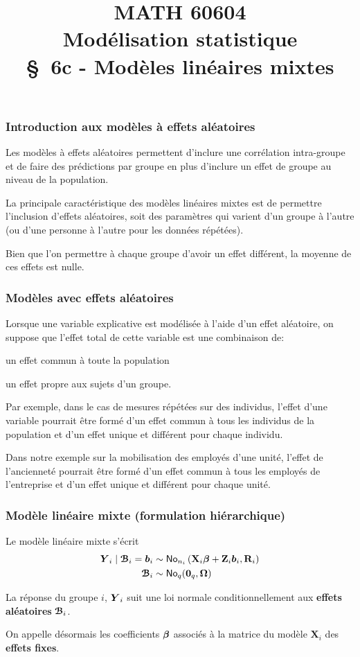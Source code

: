 \documentclass{beamer}
\title[\color{white}{MATH 60604 \S~6c - Modèles linéaires mixtes}]{\texorpdfstring{MATH 60604 \\Modélisation statistique \\ \S~6c - Modèles linéaires mixtes}{MATH 60604 \\Modélisation statistique \\ \S~6c - Modèles linéaires mixtes}}
\author{}
\institute{HEC Montréal\\
Département de sciences de la décision}
\date{}
\begin{document}
\frame{\titlepage}

\begin{frame}
\frametitle{Introduction aux modèles à effets aléatoires}
Les modèles à effets aléatoires permettent d'inclure une corrélation intra-groupe et de faire des prédictions par groupe en plus d'inclure un effet de groupe au niveau de la population.
\bi \item La principale caractéristique des \alert{modèles linéaires mixtes} est de permettre l'inclusion d'\alert{effets aléatoires},  soit des paramètres qui varient d'un groupe à l'autre (ou d'une personne à l'autre pour les données répétées).
\item Bien que l'on permettre à chaque groupe d'avoir un effet différent, la moyenne de ces effets est nulle.
\ei
\end{frame}

\begin{frame}[fragile]
\frametitle{Modèles avec effets aléatoires}
\bi
\item Lorsque une variable explicative est modélisée à l'aide d'un effet aléatoire, on suppose que \alert{l'effet total de cette variable est une combinaison de}:
\be
\item un \alert{effet commun à toute la population}
\item un \alert{effet propre aux sujets d'un groupe}.
\ee
\item Par exemple, dans le cas de mesures répétées sur des individus, l'effet d'une variable pourrait être formé d'un effet commun à tous les individus de la population et d'un effet unique et différent pour chaque individu.
\item Dans notre exemple sur la mobilisation des employés d'une unité, l'effet de l'ancienneté pourrait être formé d'un effet commun à tous les employés de l'entreprise et d'un effet unique et différent pour chaque unité.
\ei
\end{frame}

\begin{frame}
 \frametitle{Modèle linéaire mixte (formulation hiérarchique)}
Le modèle linéaire mixte s'écrit
 \begin{align*}
  \boldsymbol {Y}_i \mid \boldsymbol {\mathcal{B}}_i =\boldsymbol {b}_i &\sim \mathsf{No}_{n_i}\left( \mathbf{X}_i \boldsymbol {\beta} + \mathbf{Z}_i\boldsymbol {b}_i, \mathbf{R}_i\right) \\
  \boldsymbol {\mathcal{B}}_i & \sim \mathsf{No}_{q}( \boldsymbol {0}_q, \boldsymbol {\Omega})
 \end{align*}

 \bi \item 
 La réponse du groupe $i$, $\boldsymbol {Y}_i$ suit une loi normale conditionnellement aux \textbf{effets aléatoires} $  \boldsymbol {\mathcal{B}}_i$.
 \item 
On appelle désormais les coefficients $\boldsymbol {\beta}$ associés à la matrice du modèle $\mathbf{X}_i$ des \textbf{effets fixes}.
 \ei 
\end{frame}
\end{document}
